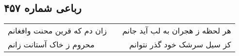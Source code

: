 \begin{center}
\section*{رباعی شماره ۴۵۷}
\label{sec:sh457}
\begin{longtable}{l p{0.5cm} r}
زان دم که قرین محنت وافغانم
&&
هر لحظه ز هجران به لب آید جانم
\\
محروم ز خاک آستانت زانم
&&
کز سیل سرشک خود گذر نتوانم
\\
\end{longtable}
\end{center}

